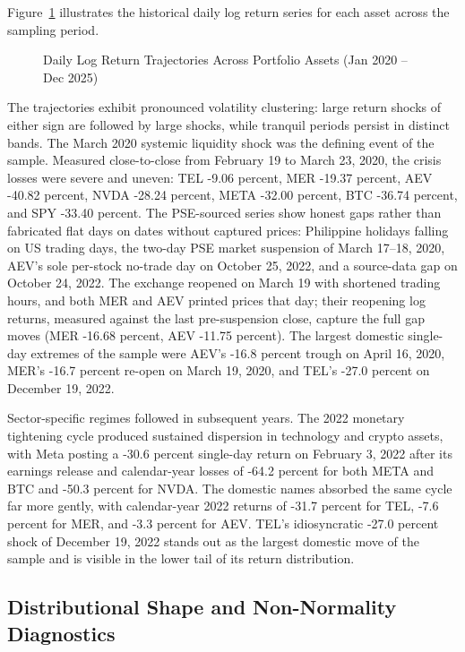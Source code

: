 Figure~\ref{fig:ts_returns} illustrates the historical daily log return series for each asset across the sampling period.

\begin{figure}[H]
  \centering
  \caption{Daily Log Return Trajectories Across Portfolio Assets (Jan 2020 -- Dec 2025)}
  \label{fig:ts_returns}
\end{figure}

The trajectories exhibit pronounced volatility clustering: large return shocks of either sign are followed by large shocks, while tranquil periods persist in distinct bands. The March 2020 systemic liquidity shock was the defining event of the sample. Measured close-to-close from February 19 to March 23, 2020, the crisis losses were severe and uneven: TEL -9.06 percent, MER -19.37 percent, AEV -40.82 percent, NVDA -28.24 percent, META -32.00 percent, BTC -36.74 percent, and SPY -33.40 percent. The PSE-sourced series show honest gaps rather than fabricated flat days on dates without captured prices: Philippine holidays falling on US trading days, the two-day PSE market suspension of March 17--18, 2020, AEV's sole per-stock no-trade day on October 25, 2022, and a source-data gap on October 24, 2022. The exchange reopened on March 19 with shortened trading hours, and both MER and AEV printed prices that day; their reopening log returns, measured against the last pre-suspension close, capture the full gap moves (MER -16.68 percent, AEV -11.75 percent). The largest domestic single-day extremes of the sample were AEV's -16.8 percent trough on April 16, 2020, MER's -16.7 percent re-open on March 19, 2020, and TEL's -27.0 percent on December 19, 2022.

Sector-specific regimes followed in subsequent years. The 2022 monetary tightening cycle produced sustained dispersion in technology and crypto assets, with Meta posting a -30.6 percent single-day return on February 3, 2022 after its earnings release and calendar-year losses of -64.2 percent for both META and BTC and -50.3 percent for NVDA. The domestic names absorbed the same cycle far more gently, with calendar-year 2022 returns of -31.7 percent for TEL, -7.6 percent for MER, and -3.3 percent for AEV. TEL's idiosyncratic -27.0 percent shock of December 19, 2022 stands out as the largest domestic move of the sample and is visible in the lower tail of its return distribution.

\subsection{Distributional Shape and Non-Normality Diagnostics}

